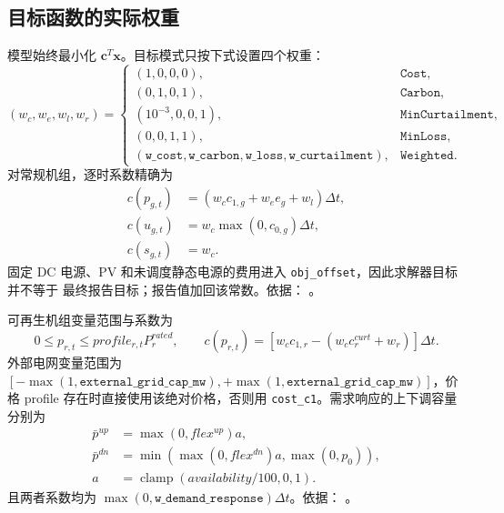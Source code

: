\subsection{目标函数的实际权重}
模型始终最小化 $\mathbf c^T\mathbf x$。目标模式只按下式设置四个权重：
\begin{equation}
 (w_c,w_e,w_l,w_r)=
 \begin{cases}
 (1,0,0,0),&\texttt{Cost},\\
 (0,1,0,1),&\texttt{Carbon},\\
 (10^{-3},0,0,1),&\texttt{MinCurtailment},\\
 (0,0,1,1),&\texttt{MinLoss},\\
 (\texttt{w\_cost},\texttt{w\_carbon},\texttt{w\_loss},
  \texttt{w\_curtailment}),&\texttt{Weighted}.
 \end{cases}
\end{equation}
对常规机组，逐时系数精确为
\begin{align}
 c(p_{g,t})&=(w_c c_{1,g}+w_e e_g+w_l)\Delta t,\\
 c(u_{g,t})&=w_c\max(0,c_{0,g})\Delta t,\\
 c(s_{g,t})&=w_c.
\end{align}
固定 DC 电源、PV 和未调度静态电源的费用进入 \texttt{obj\_offset}，因此求解器目标并不等于
最终报告目标；报告值加回该常数。依据：
。

可再生机组变量范围与系数为
\begin{equation}
 0\le p_{r,t}\le profile_{r,t}P_r^{rated},\qquad
 c(p_{r,t})=[w_c c_{1,r}-(w_c c^{curt}_r+w_r)]\Delta t.
\end{equation}
外部电网变量范围为 $[-\max(1,\texttt{external\_grid\_cap\_mw}),
+\max(1,\texttt{external\_grid\_cap\_mw})]$，价格 profile 存在时直接使用该绝对价格，否则用
\texttt{cost\_c1}。需求响应的上下调容量分别为
\begin{align}
 \bar p^{up}&=\max(0,flex^{up})a,\\
 \bar p^{dn}&=\min(\max(0,flex^{dn})a,\max(0,p_0)),\\
 a&=\operatorname{clamp}(availability/100,0,1).
\end{align}
且两者系数均为 $\max(0,\texttt{w\_demand\_response})\Delta t$。依据：
。

